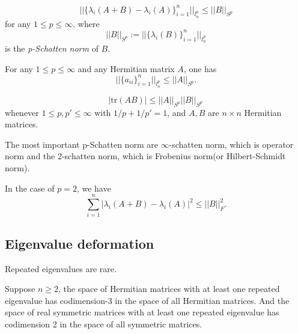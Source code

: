 \begin{proposition}
    \begin{equation}
        ||\{\lambda_i(A+B)-\lambda_i(A) \}_{i=1}^n||_{l_n^p} \leq ||B||_{S^p}
    \end{equation}
    for any $1\leq p\leq \infty$. where
    \begin{equation}
        ||B||_{S^p} := ||\{\lambda_i(B)\}_{i=1}^n||_{l^p_n}
    \end{equation}
    is the \textit{p-Schatten norm} of $B$.
\end{proposition}

For any $1\leq p \leq \infty$ and any Hermitian matrix $A$, one has
\begin{equation}
    ||\{a_{ii}\}_{i=1}^n||_{l^p_n} \leq ||A||_{S^p}.
\end{equation}

\begin{proposition}
    \begin{equation}
        |\mathrm{tr}(AB) | \leq ||A||_{S^p} ||B||_{S^{p'}}
    \end{equation}
    whenever $1\leq p,p'\leq \infty$ with $1/p+1/p' = 1$, and $A,B$ are $n\times n$ Hermitian matrices.
\end{proposition}

\begin{remark}
    The most important p-Schatten norm are $\infty$-schatten norm, which is operator norm and the 2-schatten norm, which is Frobenius norm(or Hilbert-Schmidt norm).
\end{remark}

In the case of $p=2$, we have 
\begin{equation}
    \sum_{i=1}^n |\lambda_i(A+B)-\lambda_i(A)|^2 \leq ||B||_F^2.
\end{equation}

\subsection{Eigenvalue deformation}

Repeated eigenvalues are rare.

\begin{proposition}
    Suppose $n\geq 2$, the space of Hermitian matrices with at least one repeated eigenvalue has codimension-3 in the space of all Hermitian matrices.
     And the space of real symmetric matrices with at least one repeated eigenvalue has codimension 2 in the space of all symmetric matrices.
\end{proposition}

